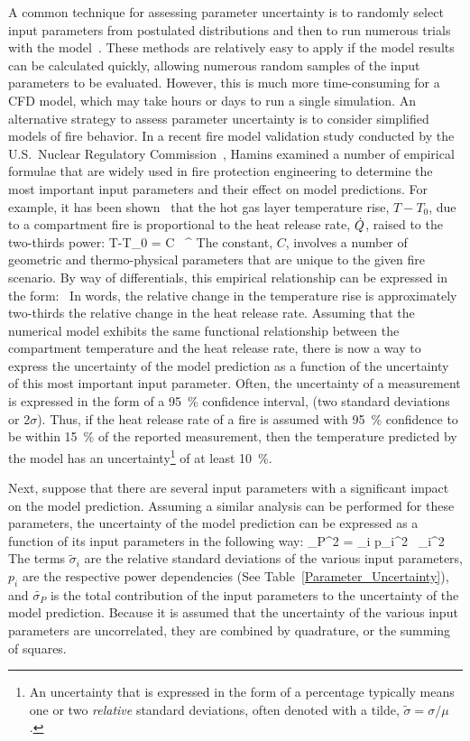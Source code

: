 A common technique for assessing parameter uncertainty is to randomly select input parameters
from postulated distributions and then to run numerous trials with the model~\cite{SFPE:Notarianni}. These methods
are relatively easy to apply if the model results can be calculated quickly, allowing numerous random samples of the input
parameters to be evaluated. However, this is much more time-consuming for a CFD model, which may take hours or days to run
a single simulation. An alternative strategy to assess parameter uncertainty is to consider simplified models of
fire behavior. In a recent fire model validation study conducted by the U.S.~Nuclear Regulatory Commission~\cite{NUREG_1824}, Hamins
examined a number of empirical formulae that are widely used in fire protection engineering to determine the
most important input parameters and their effect on model predictions.
For example, it has been shown~\cite{SFPE:Walton} that the hot gas layer temperature rise, $T-T_0$, due to
a compartment fire is proportional to the heat release rate, $\dot{Q}$, raised to the two-thirds power:
\be T-T_0 = C \, \dQ^{} \ee
The constant, $C$, involves a number of geometric and thermo-physical parameters that are unique to the given
fire scenario. By way of differentials, this empirical relationship can be expressed in the form:
\be {} \approx {} \, \frac{\Delta \dQ}{\dQ}  \ee
In words, the relative change in the temperature rise is approximately two-thirds the relative change
in the heat release rate. Assuming that the numerical model exhibits the same functional relationship between the compartment
temperature and the heat release rate, there is now a way to express the uncertainty of the model prediction as a function
of the uncertainty of this most
important input parameter. Often, the uncertainty of a measurement is expressed in the form of a 95~\% confidence interval,
(two standard deviations or 2$\sigma$).
Thus, if the heat release rate of a fire is assumed with 95~\% confidence to be
within 15~\% of the reported measurement, then the temperature
predicted by the model has an uncertainty\footnote{An uncertainty that is expressed in the form of a
percentage typically means one or two {\em relative} standard deviations, often denoted with a tilde,
$\widetilde{\sigma}=\sigma/\mu$.} of at least 10~\%.

Next, suppose that there are several input parameters with a significant impact on the model prediction. Assuming a similar
analysis can be performed for these parameters, the uncertainty of the model prediction can be expressed as a function of its
input parameters in the following way:
\be
   \widetilde{\sigma}_P^2 = \sum_i p_i^2 \, \widetilde{\sigma}_i^2  \label{parameter_uncertainty}
\ee
The terms $\widetilde{\sigma}_i$ are the relative standard deviations of the various input parameters,
$p_i$ are the respective power dependencies (See Table~\ref{Parameter_Uncertainty}), and
$\widetilde{\sigma_P}$ is the total contribution of the input parameters to the uncertainty of the model prediction.
Because it is assumed that the uncertainty of the various input parameters are uncorrelated, they are combined by
quadrature, or the summing of squares.

